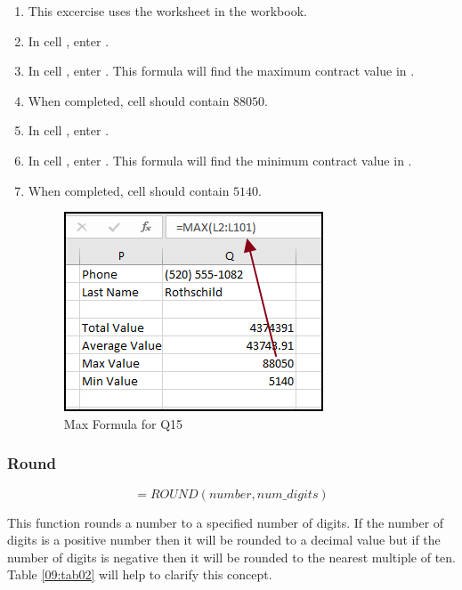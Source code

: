 \begin{enumerate}
	\item This excercise uses the  worksheet in the  workbook.
	\item In cell , enter .
	\item In cell , enter . This formula will find the maximum contract value in .
	\item When completed, cell  should contain $ 88050 $.
	\item In cell , enter .
	\item In cell , enter . This formula will find the minimum contract value in .
	\item When completed, cell  should contain $ 5140 $.

	\begin{figure}[H]
		\centering
		\includegraphics[width=\maxwidth{.75\linewidth}]{gfx/ch09_fig40}
		\caption{Max Formula for Q15}
		\label{09:fig40}
	\end{figure}

\end{enumerate}

\subsubsection{Round}

\[ =ROUND(number, num\_digits) \]

This function rounds a number to a specified number of digits. If the number of digits is a positive number then it will be rounded to a decimal value but if the number of digits is negative then it will be rounded to the nearest multiple of ten. Table \ref{09:tab02} will help to clarify this concept.

